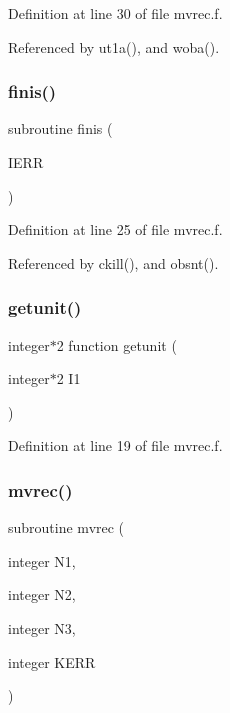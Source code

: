 Definition at line 30 of file mvrec.\+f.



Referenced by ut1a(), and woba().

\mbox{\label{mvrec_8f_ac2413c6bd75bfab4324833e460b06c3a}} 
\subsubsection{\texorpdfstring{finis()}{finis()}}
{\footnotesize\ttfamily subroutine finis (\begin{DoxyParamCaption}\item[{}]{I\+E\+RR }\end{DoxyParamCaption})}



Definition at line 25 of file mvrec.\+f.



Referenced by ckill(), and obsnt().

\mbox{\label{mvrec_8f_a797694779b864502c8bdc294d52eddb8}} 
\subsubsection{\texorpdfstring{getunit()}{getunit()}}
{\footnotesize\ttfamily integer$\ast$2 function getunit (\begin{DoxyParamCaption}\item[{integer$\ast$2}]{I1 }\end{DoxyParamCaption})}



Definition at line 19 of file mvrec.\+f.

\mbox{\label{mvrec_8f_a0803c04e9b4764ac3f1966994ef63e26}} 
\subsubsection{\texorpdfstring{mvrec()}{mvrec()}}
{\footnotesize\ttfamily subroutine mvrec (\begin{DoxyParamCaption}\item[{integer}]{N1,  }\item[{integer}]{N2,  }\item[{integer}]{N3,  }\item[{integer}]{K\+E\+RR }\end{DoxyParamCaption})}



